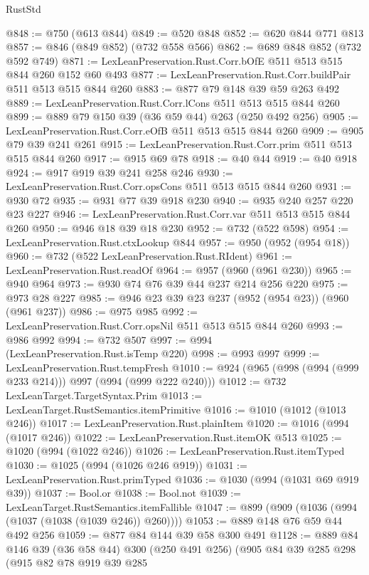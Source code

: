 \begin{lexlean}{RustStd}
\begin{coremodule}
@848 := @750 (@613 @844)
@849 := @520 @848
@852 := @620 @844 @771 @813
@857 := @846 (@849 @852) (@732 @558 @566)
@862 := @689 @848 @852 (@732 @592 @749)
@871 := LexLeanPreservation.Rust.Corr.bOfE @511 @513 @515 @844 @260 @152 @60 @493
@877 := LexLeanPreservation.Rust.Corr.buildPair @511 @513 @515 @844 @260
@883 := @877 @79 @148 @39 @59 @263 @492
@889 := LexLeanPreservation.Rust.Corr.lCons @511 @513 @515 @844 @260
@899 := @889 @79 @150 @39 (@36 @59 @44) @263 (@250 @492 @256)
@905 := LexLeanPreservation.Rust.Corr.eOfB @511 @513 @515 @844 @260
@909 := @905 @79 @39 @241 @261
@915 := LexLeanPreservation.Rust.Corr.prim @511 @513 @515 @844 @260
@917 := @915 @69 @78
@918 := @40 @44
@919 := @40 @918
@924 := @917 @919 @39 @241 @258 @246
@930 := LexLeanPreservation.Rust.Corr.opsCons @511 @513 @515 @844 @260
@931 := @930 @72
@935 := @931 @77 @39 @918 @230
@940 := @935 @240 @257 @220 @23 @227
@946 := LexLeanPreservation.Rust.Corr.var @511 @513 @515 @844 @260
@950 := @946 @18 @39 @18 @230
@952 := @732 (@522 @598)
@954 := LexLeanPreservation.Rust.ctxLookup @844
@957 := @950 (@952 (@954 @18))
@960 := @732 (@522 LexLeanPreservation.Rust.RIdent)
@961 := LexLeanPreservation.Rust.readOf
@964 := @957 (@960 (@961 @230))
@965 := @940 @964
@973 := @930 @74 @76 @39 @44 @237 @214 @256 @220
@975 := @973 @28 @227
@985 := @946 @23 @39 @23 @237 (@952 (@954 @23)) (@960 (@961 @237))
@986 := @975 @985
@992 := LexLeanPreservation.Rust.Corr.opsNil @511 @513 @515 @844 @260
@993 := @986 @992
@994 := @732 @507
@997 := @994 (LexLeanPreservation.Rust.isTemp @220)
@998 := @993 @997
@999 := LexLeanPreservation.Rust.tempFresh
@1010 := @924 (@965 (@998 (@994 (@999 @233 @214))) @997 (@994 (@999 @222 @240)))
@1012 := @732 LexLeanTarget.TargetSyntax.Prim
@1013 := LexLeanTarget.RustSemantics.itemPrimitive
@1016 := @1010 (@1012 (@1013 @246))
@1017 := LexLeanPreservation.Rust.plainItem
@1020 := @1016 (@994 (@1017 @246))
@1022 := LexLeanPreservation.Rust.itemOK @513
@1025 := @1020 (@994 (@1022 @246))
@1026 := LexLeanPreservation.Rust.itemTyped
@1030 := @1025 (@994 (@1026 @246 @919))
@1031 := LexLeanPreservation.Rust.primTyped
@1036 := @1030 (@994 (@1031 @69 @919 @39))
@1037 := Bool.or
@1038 := Bool.not
@1039 := LexLeanTarget.RustSemantics.itemFallible
@1047 := @899 (@909 (@1036 (@994 (@1037 (@1038 (@1039 @246)) @260))))
@1053 := @889 @148 @76 @59 @44 @492 @256
@1059 := @877 @84 @144 @39 @58 @300 @491
@1128 := @889
    @84
    @146
    @39
    (@36 @58 @44)
    @300
    (@250 @491 @256)
    (@905
      @84
      @39
      @285
      @298
      (@915
        @82
        @78
        @919
        @39
        @285

\end{coremodule}
\end{lexlean}
